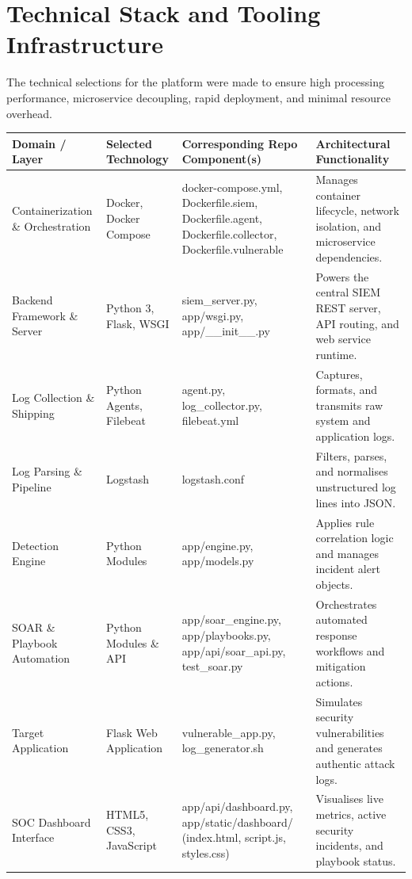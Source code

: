\section{Technical Stack and Tooling Infrastructure}

The technical selections for the platform were made to ensure high processing performance, microservice decoupling, rapid deployment, and minimal resource overhead.

\begin{table}[htbp]
\centering
\begin{tabular}{|P{5cm}|P{3cm}|P{5cm}|P{5cm}|}
\hline
Domain / Layer & Selected Technology & Corresponding Repo Component(s) & Architectural Functionality \\ \hline
Containerization \& Orchestration & Docker, Docker Compose & docker-compose.yml, Dockerfile.siem, Dockerfile.agent, Dockerfile.collector, Dockerfile.vulnerable & Manages container lifecycle, network isolation, and microservice dependencies. \\ \hline
Backend Framework \& Server & Python 3, Flask, WSGI & siem\_server.py, app/wsgi.py, app/\_\_init\_\_.py & Powers the central SIEM REST server, API routing, and web service runtime. \\ \hline
Log Collection \& Shipping & Python Agents, Filebeat & agent.py, log\_collector.py, filebeat.yml & Captures, formats, and transmits raw system and application logs. \\ \hline
Log Parsing \& Pipeline & Logstash & logstash.conf & Filters, parses, and normalises unstructured log lines into JSON. \\ \hline
Detection Engine & Python Modules & app/engine.py, app/models.py & Applies rule correlation logic and manages incident alert objects. \\ \hline
SOAR \& Playbook Automation & Python Modules \& API & app/soar\_engine.py, app/playbooks.py, app/api/soar\_api.py, test\_soar.py & Orchestrates automated response workflows and mitigation actions. \\ \hline
Target Application & Flask Web Application & vulnerable\_app.py, log\_generator.sh & Simulates security vulnerabilities and generates authentic attack logs. \\ \hline
SOC Dashboard Interface & HTML5, CSS3, JavaScript & app/api/dashboard.py, app/static/dashboard/ (index.html, script.js, styles.css) & Visualises live metrics, active security incidents, and playbook status. \\ \hline
\end{tabular}
\end{table}

